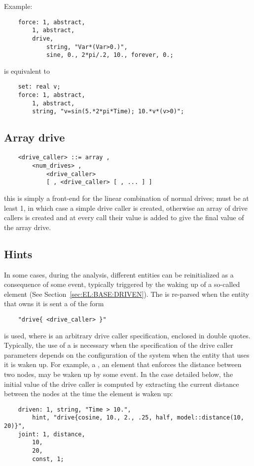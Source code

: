\noindent
Example:
\begin{verbatim}
    force: 1, abstract,
        1, abstract,
        drive,
            string, "Var*(Var>0.)",
            sine, 0., 2*pi/.2, 10., forever, 0.;
\end{verbatim}
is equivalent to
\begin{verbatim}
    set: real v;
    force: 1, abstract,
        1, abstract,
        string, "v=sin(5.*2*pi*Time); 10.*v*(v>0)";
\end{verbatim}


\subsection{Array drive}
\begin{verbatim}
    <drive_caller> ::= array ,
        <num_drives> ,
            <drive_caller> 
            [ , <drive_caller> [ , ... ] ]
\end{verbatim}
this is simply a front-end for the linear combination of  
normal drives;  must be at least 1, in which case 
a simple drive caller is created, otherwise an array of drive callers 
is created and at every call their value is added to give 
the final value of the array drive.


\subsection{Hints}\label{sec:GENERAL:DRIVE:HINT}
In some cases, during the analysis, different entities can be reinitialized
as a consequence of some event, typically triggered by the waking up 
of a so-called  element (See Section~\ref{sec:EL:BASE:DRIVEN}).
The  is re-parsed when the entity that owns it is sent
a  of the form
\begin{verbatim}
    "drive{ <drive_caller> }"
\end{verbatim}
is used, where  is an arbitrary drive caller specification,
enclosed in double quotes.
Typically, the use of a  is necessary when the specification of the
drive caller parameters depends on the configuration of the system when the
entity that uses it is waken up.
For example, a , an element that enforces the distance
between two nodes, may be waken up by some event.
In the case detailed below, the initial value of the  drive caller
is computed by extracting the current distance between the nodes at the time
the element is waken up:
\begin{verbatim}
    driven: 1, string, "Time > 10.",
        hint, "drive{cosine, 10., 2., .25, half, model::distance(10, 20)}",
    joint: 1, distance,
        10,
        20,
        const, 1;
\end{verbatim}



